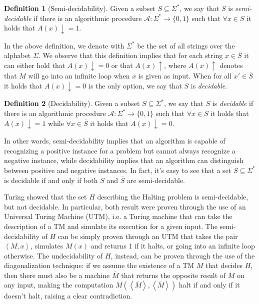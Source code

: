 \documentclass[12pt,a4paper]{article}
\theoremstyle{definition}
\newtheorem{definition}{Definition}
\newcommand{\abk}[1]{\left\langle#1\right\rangle}
\begin{document}
    \begin{definition}[Semi-decidability]
        Given a subset $S \subseteq \Sigma^*$, we say that $S$ is \textit{semi-decidable} if there is an algorithmic procedure $\mathcal{A} : \Sigma^* \to \{0, 1\}$ such that $\forall x \in S$ it holds that $A(x) \downarrow= 1$.
    \end{definition}

    In the above definition, we denote with $\Sigma^*$ be the set of all strings over the alphabet $\Sigma$. We observe that this definition implies that for each string $x \in \overline{S}$ it can either hold that $A(x) \downarrow= 0$ or that $A(x) \uparrow$, where $A(x) \uparrow$ denotes that $M$ will go into an infinite loop when $x$ is given as input. When for all $x' \in \overline{S}$ it holds that $A(x) \downarrow= 0$ is the only option, we say that $S$ is \textit{decidable}.

    \begin{definition}[Decidability]
        Given a subset $S \subseteq \Sigma^*$, we say that $S$ is \textit{decidable} if there is an algorithmic procedure $\mathcal{A} : \Sigma^* \to \{0, 1\}$ such that $\forall x \in S$ it holds that $A(x) \downarrow= 1$ while $\forall x \in \overline{S}$ it holds that $A(x) \downarrow= 0$.
    \end{definition}
    
    In other words, semi-decidability implies that an algorithm is capable of recognizing a positive instance for a problem but cannot always recognize a negative instance, while decidability implies that an algorithm can distinguish between positive and negative instances. In fact, it's easy to see that a set $S \subseteq \Sigma^*$ is decidable if and only if both $S$ and $\overline{S}$ are semi-decidable.

    Turing showed that the set $H$ describing the Halting problem is semi-decidable, but not decidable. In particular, both result were proven through the use of an Universal Turing Machine (UTM), i.e. a Turing machine that can take the description of a TM and simulate its execution for a given input. The semi-decidability of $H$ can be simply proven through an UTM that takes the pair $\abk{M,x}$, simulates $M(x)$ and returns 1 if it halts, or going into an infinite loop otherwise. The undecidability of $H$, instead, can be proven through the use of the diagonalization technique: if we assume the existence of a TM $M$ that decides $H$, then there must also be a machine $\overline{M}$ that returns the opposite result of $M$ on any input, making the computation $M(\abk{\overline{M}}, \abk{\overline{M}})$ halt if and only if it doesn't halt, raising a clear contradiction.
\end{document}
